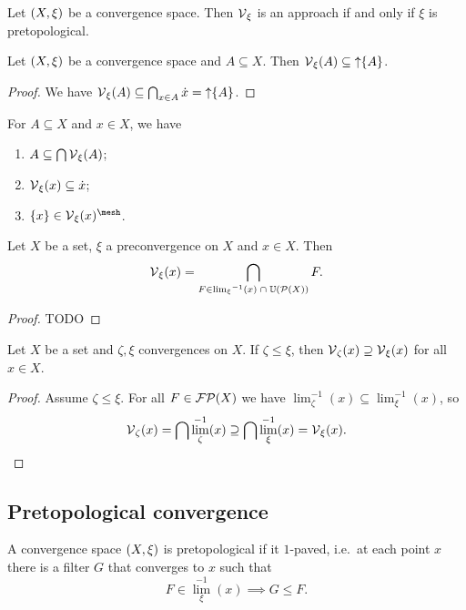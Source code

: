 \begin{lemma}
Let $\sSet{X,\xi}$ be a convergence space. Then $\operatorname{\mathcal{V}}_\xi$ is an approach \textup{if and only if} $\xi$ is pretopological.
\end{lemma}

\begin{lemma} \label{vicinityOfSetLemma}
Let $\sSet{X,\xi}$ be a convergence space and $A\subseteq X$. Then $\operatorname{\mathcal{V}}_\xi(A) \subseteq \operatorname{\uparrow}\{A\}$.
\end{lemma}
\begin{proof}
We have $\operatorname{\mathcal{V}}_\xi(A) \subseteq \bigcap_{x\in A}\dot{x} = \operatorname{\uparrow} \{A\}$. 
\end{proof}
\begin{corollary} \label{vicinityOfSetCorollary}
For $A\subseteq X$ and $x\in X$, we have
\begin{enumerate}
\item $A \subseteq \bigcap\operatorname{\mathcal{V}}_\xi(A)$;
\item $\operatorname{\mathcal{V}}_\xi(x) \subseteq \dot{x}$;
\item $\{x\}\in\vicinity_\xi(x)^{\mesh}$.
\end{enumerate}
\end{corollary}

\begin{lemma}
Let $X$ be a set, $\xi$ a preconvergence on $X$ and $x\in X$. Then
\[ \operatorname{\mathcal{V}}_\xi(x) = \bigcap_{F\in {\lim_\xi}^{-1}(x)\;\cap\; \operatorname{\mathbb{U}}(\operatorname{\mathcal{P}}(X))}F. \]
\end{lemma}
\begin{proof}
TODO
\end{proof}

\begin{lemma} \label{vicinityMapAntitone}
Let $X$ be a set and $\zeta, \xi$ convergences on $X$. If $\zeta \leq \xi$, then $\operatorname{\mathcal{V}}_\zeta(x) \supseteq \operatorname{\mathcal{V}}_\xi(x)$ for all $x\in X$.
\end{lemma}
\begin{proof}
Assume $\zeta \leq \xi$. For all $F\in \operatorname{\mathcal{FP}}(X)$ we have $\lim_\zeta^{-1}(x) \subseteq \lim_\xi^{-1}(x)$, so
\[ \operatorname{\mathcal{V}}_\zeta(x) = \bigcap \lim_\zeta^{-1}(x) \supseteq \bigcap \lim_\xi^{-1}(x) = \operatorname{\mathcal{V}}_\xi(x). \]
\end{proof}


\subsection{Pretopological convergence}
A convergence space $\sSet{X,\xi}$ is pretopological if it $1$-paved, i.e.\ at each point $x$ there is a filter $G$ that converges to $x$ such that
\[ F\in {\lim}_\xi^{-1}(x) \implies G \leq F. \]

